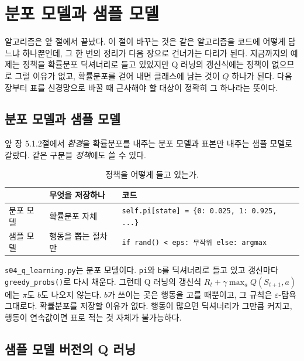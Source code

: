 \documentclass[11pt,a4paper]{article}
\begin{document}
\section{분포 모델과 샘플 모델}
\label{sec:models}

알고리즘은 앞 절에서 끝났다. 이 절이 바꾸는 것은 같은 알고리즘을 코드에 어떻게 담느냐 하나뿐인데,
그 한 번의 정리가 다음 장으로 건너가는 다리가 된다. 지금까지의 예제는 정책을 확률분포 딕셔너리로
들고 있었지만 Q 러닝의 갱신식에는 정책이 없으므로 그럴 이유가 없고, 확률분포를 걷어 내면 클래스에
남는 것이 $Q$ 하나가 된다. 다음 장부터 표를 신경망으로 바꿀 때 근사해야 할 대상이 정확히 그 하나라는
뜻이다.

\subsection{분포 모델과 샘플 모델}
\label{sec:models-def}

앞 장 5.1.2절에서 \emph{환경}을 확률분포를 내주는 분포 모델과 표본만 내주는 샘플 모델로 갈랐다.
같은 구분을 \emph{정책}에도 쓸 수 있다.

\begin{table}[htbp]
\centering
\caption{정책을 어떻게 들고 있는가.}
\label{tab:policy-models}
\small
\begin{tabular}{@{}lll@{}}
\toprule
 & 무엇을 저장하나 & 코드 \\
\midrule
분포 모델 & 확률분포 자체 & \lstinline|self.pi[state] = {0: 0.025, 1: 0.925, ...}| \\
샘플 모델 & 행동을 뽑는 절차만 & \lstinline|if rand() < eps: 무작위 else: argmax| \\
\bottomrule
\end{tabular}
\end{table}

\texttt{s04\_q\_learning.py}는 분포 모델이다. \lstinline|pi|와 \lstinline|b|를 딕셔너리로 들고
있고 갱신마다 \lstinline|greedy_probs()|로 다시 채운다. 그런데 Q 러닝의 갱신식
$R_t + \gamma\max_a Q(S_{t+1},a)$에는 $\pi$도 $b$도 나오지 않는다. $b$가 쓰이는 곳은 행동을 고를
때뿐이고, 그 규칙은 $\varepsilon$-탐욕 그대로다. 확률분포를 저장할 이유가 없다. 행동이 많으면
딕셔너리가 그만큼 커지고, 행동이 연속값이면 표로 적는 것 자체가 불가능하다.

\subsection{샘플 모델 버전의 Q 러닝}
\label{sec:sample-q}
\end{document}

